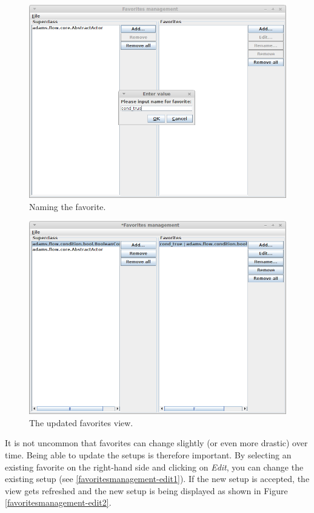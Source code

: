 \begin{figure}[htb]
  \centering
  \includegraphics[width=12.0cm]{images/favoritesmanagement-addsuper3.png}
  \caption{Naming the favorite.}
  \label{favoritesmanagement-addsuper3}
\end{figure}

\begin{figure}[htb]
  \centering
  \includegraphics[width=12.0cm]{images/favoritesmanagement-addsuper4.png}
  \caption{The updated favorites view.}
  \label{favoritesmanagement-addsuper4}
\end{figure}

\clearpage
{}
It is not uncommon that favorites can change slightly (or even more drastic)
over time. Being able to update the setups is therefore important. By selecting
an existing favorite on the right-hand side and clicking on \textit{Edit}, you
can change the existing setup (see \ref{favoritesmanagement-edit1}). If the
new setup is accepted, the view gets refreshed and the new setup is being
displayed as shown in Figure \ref{favoritesmanagement-edit2}.

